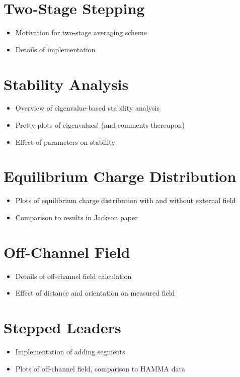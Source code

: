\documentclass{article}
\begin{document}
\section{Two-Stage Stepping}
\begin{itemize}
\item Motivation for two-stage averaging scheme
\item Details of implementation
\end{itemize}

\section{Stability Analysis}
\begin{itemize}
\item Overview of eigenvalue-based stability analysis
\item Pretty plots of eigenvalues! (and comments thereupon)
\item Effect of parameters on stability
\end{itemize}

\section{Equilibrium Charge Distribution}
\begin{itemize}
\item Plots of equilibrium charge distribution with and without external field
\item Comparison to results in Jackson paper
\end{itemize}

\section{Off-Channel Field}
\begin{itemize}
\item Details of off-channel field calculation
\item Effect of distance and orientation on measured field
\end{itemize}

\section{Stepped Leaders}
\begin{itemize}
\item Implementation of adding segments
\item Plots of off-channel field, comparison to HAMMA data
\end{itemize}
\end{document}
